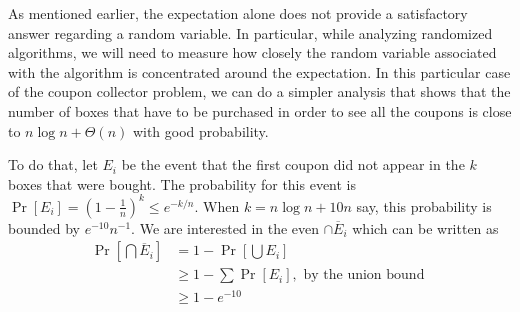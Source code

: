 As mentioned earlier, the expectation alone does not provide a satisfactory answer regarding a random variable. In particular, while analyzing randomized algorithms, we will need to measure how closely the random variable associated with the algorithm is concentrated around the expectation. In this particular case of the coupon collector problem, we can do a simpler analysis that shows that the number of boxes that have to be purchased in order to see all the coupons is close to $n\log n + \Theta(n)$ with good probability. 

To do that, let $E_i$ be the event that the first coupon did not appear in the $k$ boxes that were bought. The probability for this event is $\Pr[E_i] = \left(  1- \frac{1}{n} \right)^k\leq e^{-k/n}$. When $k=n\log n + 10n$ say, this probability is bounded by $e^{-10}n^{-1}$. We are interested in the even $\cap \overline{E}_i$ which can be written as
\begin{align*}
	\Pr\left[\bigcap \overline{E}_i \right] &= 1 - \Pr\left[ \bigcup E_i \right]\\
	&\geq 1 - \sum \Pr[E_i], \text{ by the union bound }\\
	&\geq 1 - e^{-10}
\end{align*}

